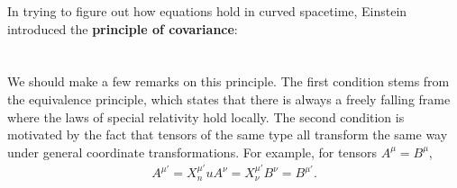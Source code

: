 \documentclass{article}
\theoremstyle{definition}
\begin{document}
In trying to figure out how equations hold in curved spacetime, Einstein introduced the \textbf{principle of covariance}:\\

\\\\

We should make a few remarks on this principle. The first condition stems from the equivalence principle, which states that there is always a freely falling frame where the laws of special relativity hold locally. The second condition is motivated by the fact that tensors of the same type all transform the same way under general coordinate transformations. For example, for tensors $A^{\mu} = B^\mu$,
\begin{align*}
A^{\mu'} = X^{\mu'}_nuA^\nu = X^{\mu'}_\nu B^{\nu} = B^{\mu'}.
\end{align*}
\end{document}
